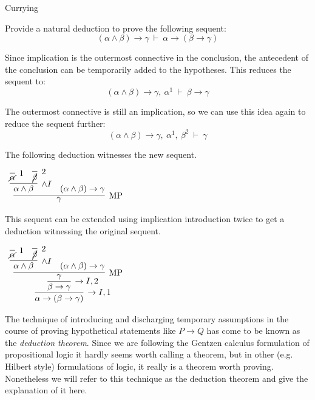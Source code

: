 \documentclass{book}
\begin{document}
    \begin{eg}{Currying}
        
        Provide a natural deduction to prove the following sequent: $$(\alpha \land \beta) \to \gamma \ \vdash \ \alpha \to (\beta \to \gamma)$$

        Since implication is the outermost connective in the conclusion, the antecedent of the conclusion can be temporarily added to the hypotheses. This reduces the sequent to: $$(\alpha \land \beta) \to \gamma, \ \alpha^{1} \ \vdash \ \beta \to \gamma$$

        The outermost connective is still an implication, so we can use this idea again to reduce the sequent further: $$(\alpha \land \beta) \to \gamma, \ \alpha^{1}, \ \beta^{2} \ \vdash \ \gamma$$

        The following deduction witnesses the new sequent.

        \begin{center}
            $\begin{array}{c}
                \infer[\MP]{\gamma}
                            {\infer[\land I]{\alpha \land \beta}
                                {\infer[1]{\cancel{\alpha}}{} & \infer[2]{\cancel{\beta}}{}}
                            &							
                            (\alpha \land \beta) \to \gamma}
            \end{array}$
        \end{center}

        This sequent can be extended using implication introduction twice to get a deduction witnessing the original sequent. 

        \begin{center}
            $\begin{array}{c}
                \infer[\to I,1]{\alpha \to (\beta \to \gamma)}
                    {\infer[\to I,2]{\beta \to \gamma}
                        {\infer[\MP]{\gamma}
                            {\infer[\land I]{\alpha \land \beta}
                                {\infer[1]{\cancel{\alpha}}{} & \infer[2]{\cancel{\beta}}{}}
                            &							
                            (\alpha \land \beta) \to \gamma}}}
            \end{array}$
        \end{center}
    \end{eg}

    The technique of introducing and discharging temporary assumptions in the course of proving hypothetical statements like $P \to Q$ has come to be known as the \emph{deduction theorem}. Since we are following the Gentzen calculus formulation of propositional logic it hardly seems worth calling a theorem, but in other (e.g. Hilbert style) formulations of logic, it really is a theorem worth proving. Nonetheless we will refer to this technique as the deduction theorem and give the explanation of it here. 
\end{document}
